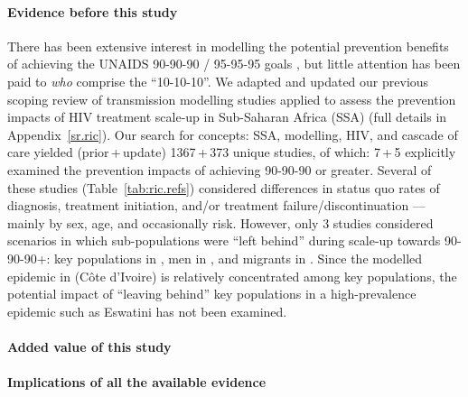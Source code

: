 \newcommand{\pu}[2]{#1\,+\,#2}
\begin{ric}
  \paragraph{Evidence before this study}
  There has been extensive interest in modelling the potential prevention benefits of
  achieving the UNAIDS 90-90-90 / 95-95-95 goals \cite{909090,959595},
  but little attention has been paid to \emph{who} comprise the ``10-10-10''.
  We adapted and updated our previous scoping review of transmission modelling studies
  applied to assess the prevention impacts of HIV treatment scale-up in Sub-Saharan Africa (SSA)
  \cite{Knight2022sr} (full details in Appendix~\ref{sr.ric}).
  Our search for concepts: SSA, modelling, HIV, and cascade of care
  yielded (\pu{prior}{update}) \pu{1367}{373} unique studies, of which:
  \pu{7}{5} explicitly examined the prevention impacts of achieving 90-90-90 or greater.
  Several of these studies (Table~\ref{tab:ric.refs}) considered differences in
  status quo rates of diagnosis, treatment initiation, and/or treatment failure/discontinuation
  --- mainly by sex, age, and occasionally risk.
  However, only 3 studies considered scenarios in which
  sub-populations were ``left behind'' during scale-up towards 90-90-90+:
  key populations in \cite{Maheu-Giroux2017art},
  men in \cite{Reidy2019}, and
  migrants in \cite{Marukutira2020}.
  Since the modelled epidemic in \cite{Maheu-Giroux2017art} (C\^{o}te d'Ivoire)
  is relatively concentrated among key populations,
  the potential impact of ``leaving behind'' key populations
  in a high-prevalence epidemic such as Eswatini has not been examined.
  \paragraph{Added value of this study}
  \paragraph{Implications of all the available evidence}
\end{ric}
